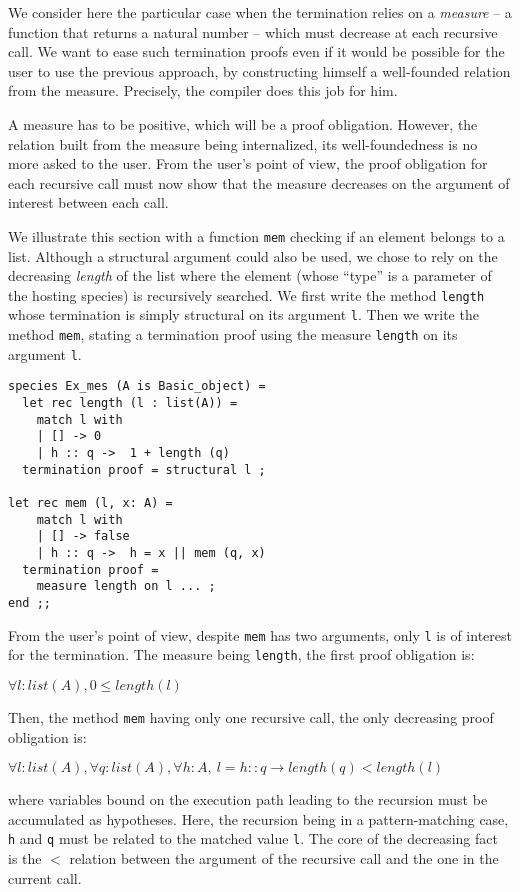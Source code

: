 We consider here the particular case when the termination relies on a
\emph{measure} -- a  function that returns a natural number --
which must decrease at each recursive call.
We want to ease such termination proofs even if it would
be possible for the user to use the previous approach, by constructing
himself a well-founded relation from the measure. Precisely, the compiler
does this job for him.

A measure has to be positive, which will be a proof obligation.
However, the relation built from the  measure being internalized, its
well-foundedness is no more asked
to the user. From the user's point of view, the proof obligation for each
recursive call must now show that the measure decreases on the
argument of interest between each call.

\medskip
We illustrate this section with a function {\tt mem} checking if an element
belongs to a list. Although a structural argument could also be used, we
chose to rely on the decreasing {\em length} of the list where the element
(whose ``type'' is a parameter of the hosting species) is recursively
searched.  We first write the method {\tt length} whose termination is simply
structural on its argument {\tt l}. Then we write the method {\tt mem},
stating a termination proof using the measure {\tt length} on its argument
{\tt l}.

\noindent
{\scriptsize
\begin{lstlisting}
species Ex_mes (A is Basic_object) =
  let rec length (l : list(A)) =
    match l with
    | [] -> 0
    | h :: q ->  1 + length (q)
  termination proof = structural l ;

let rec mem (l, x: A) =
    match l with
    | [] -> false
    | h :: q ->  h = x || mem (q, x)
  termination proof =
    measure length on l ... ;
end ;;
\end{lstlisting}
}

From the user's point of view, despite {\tt mem} has two arguments,
only {\tt l} is of interest for the termination. The measure being
{\tt length}, the first proof obligation is:

$\forall l: list (A), 0 \leq length (l)$

\noindent
Then, the method {\tt mem} having only one recursive call, the only
decreasing proof obligation is:

$\forall l : list(A), \forall q : list(A), \forall h : A,
  \ l = h :: q \rightarrow length (q) < length (l)$

\noindent where variables bound on the execution path leading to the
recursion must be accumulated as hypotheses. Here, the recursion being
in a pattern-matching case, {\tt h} and {\tt q} must be related to the
matched value {\tt l}. The core of the decreasing fact is the $<$
relation between the argument of the recursive call and the one in the
current call.

